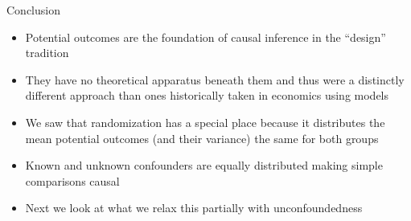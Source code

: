 \documentclass{beamer}
\begin{document}
\begin{frame}{Conclusion}

\begin{itemize}

\item Potential outcomes are the foundation of causal inference in the ``design'' tradition
\item They have no theoretical apparatus beneath them and thus were a distinctly different approach than ones historically taken in economics using models
\item We saw that randomization has a special place because it distributes the mean potential outcomes (and their variance) the same for both groups
\item Known and unknown confounders are equally distributed making simple comparisons causal
\item Next we look at what we relax this partially with unconfoundedness
\end{itemize}

\end{frame}
\end{document}
